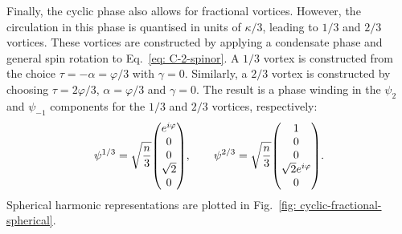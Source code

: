 Finally, the cyclic phase also allows for fractional vortices.
However, the circulation in this phase is quantised in units of \(\kappa / 3\),
leading to \(1/3\) and \(2/3\) vortices.
These vortices are constructed by applying a condensate phase and general spin
rotation to Eq.~\eqref{eq: C-2-spinor}.
A \(1/3\) vortex is constructed from the choice
\(\tau = -\alpha = \varphi/3 \) with \(\gamma = 0\).
Similarly, a \(2/3\) vortex is constructed by choosing \(\tau = 2\varphi/3\),
\(\alpha = \varphi/3\) and \(\gamma=0\).
The result is a phase winding in the \(\psi_2\) and \(\psi_{-1}\) components
for the \(1/3\) and \(2/3\) vortices, respectively:
\begin{equation}
    \psi^{1/3} = \sqrt{\frac{n}{3}}\mqty(e^{i\varphi} \\ 0 \\ 0 \\ \sqrt{2}\\0),
    \qquad
    \psi^{2/3} = \sqrt{\frac{n}{3}}\mqty(1 \\ 0 \\ 0 \\\sqrt{2}e^{i\varphi}\\0).
\end{equation}
Spherical harmonic representations are plotted in
Fig.~\ref{fig: cyclic-fractional-spherical}.
